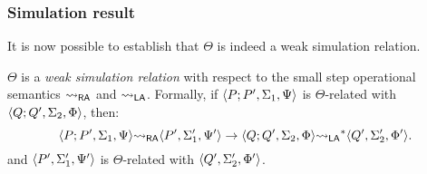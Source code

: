 \subsubsection{Simulation result}

It is now possible to establish that $\Theta$ is indeed a weak simulation relation.

\begin{lemma}
  $\Theta$ is a \emph{weak simulation relation} with respect to the small step operational
  semantics ${\leadsto_{\mathsf{RA}}}$ and ${\leadsto_{\mathsf{LA}}}$. Formally,
  if $\langle P; P', \Sigma_1, \Psi\rangle$ is $\Theta$-related with
  $\langle Q;Q', \Sigma_2, \Phi\rangle$, then:
  $$
  \langle P; P', \Sigma_1, \Psi\rangle {\leadsto_{\mathsf{RA}}} \langle P', \Sigma_1', \Psi'\rangle
  \to
  \langle Q;Q', \Sigma_2, \Phi\rangle {\leadsto_{\mathsf{LA}}}^* \langle Q', \Sigma_2', \Phi'\rangle.
  $$
  and
  $\langle P', \Sigma_1', \Psi'\rangle$
  is $\Theta$-related with $\langle Q', \Sigma_2', \Phi'\rangle$.
\end{lemma}
